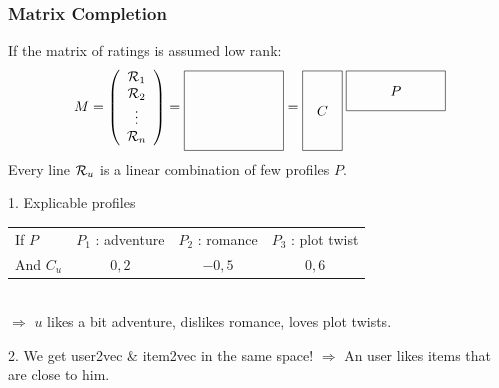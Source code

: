 \documentclass[handout]{beamer}
\begin{document}
\begin{frame}
	\frametitle{Matrix Completion}
	If the matrix of ratings is assumed \alert{low rank}:
	\[ M = \left(\begin{array}{c}
	\R_1\\
	\R_2\\
	\vdots\\
	\R_n
	\end{array}\right) = \raisebox{-1cm}{\begin{tikzpicture}
	\draw (0,0) rectangle (2.5,2);
	\end{tikzpicture}} =
	\raisebox{-1cm}{\begin{tikzpicture}
	\draw (0,0) rectangle ++(1,2);
	\draw node at (0.5,1) {$C$};
	\draw (1.1,1) rectangle ++(2.5,1);
	\draw node at (2.35,1.5) {$P$};
	\end{tikzpicture}} \]
	Every line $\mathcal{R}_u$ is a linear combination of few profiles $P$.
  \pause
  \begin{exampleblock}{1. Explicable profiles}
	\begin{tabular}{@{}lccc@{}}
	If $P$ & $P_1$ : adventure & $P_2$ : romance & $P_3$ : plot twist\\
	And $C_u$ & $0,2$ & $-0,5$ & $0,6$
	\end{tabular}\\
	$\Rightarrow$ $u$ \alert{likes a bit} adventure, \alert{dislikes} romance, \alert{loves} plot twists.
	\end{exampleblock}
  \pause
  \begin{exampleblock}{2. We get user2vec \& item2vec in the same space!}
  $\Rightarrow$ An user likes items that are \alert{close to him}.\\[1pt]\vfill
  \end{exampleblock}
\end{frame}
\end{document}
